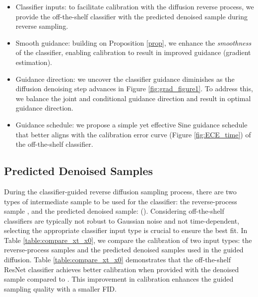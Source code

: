 \documentclass{article}
\theoremstyle{definition}
\begin{document}
\begin{itemize}
\item Classifier inputs: to facilitate calibration with the diffusion reverse process, we provide the off-the-shelf classifier with the predicted denoised sample  during reverse sampling. 
\item Smooth guidance: building on Proposition \ref{prop}, we enhance the \textit{smoothness} of the classifier, enabling calibration to result in improved guidance (gradient estimation). 
\item Guidance direction: we uncover the classifier guidance diminishes as the diffusion denoising step advances in Figure \ref{fig:grad_figure1}. To address this, we balance the joint and conditional guidance direction and result in optimal guidance direction. 
\item Guidance schedule: we propose a simple yet effective Sine guidance schedule that better aligns with the calibration error curve (Figure \ref{fig:ECE_time}) of the off-the-shelf classifier.
\end{itemize}

\subsection{Predicted Denoised Samples}
During the classifier-guided reverse diffusion sampling process, there are two types of intermediate sample to be used for the classifier: the reverse-process sample , and the predicted denoised sample:  (\cite{song2020denoising, bansal2023universal}). 
Considering off-the-shelf classifiers are typically not robust to Gaussian noise and not time-dependent, 
selecting the appropriate classifier input type is crucial to ensure the best fit. In Table \ref{table:compare_xt_x0}, we compare the calibration of two input types: the reverse-process samples  and the predicted denoised samples  used in the guided diffusion. 
Table \ref{table:compare_xt_x0} demonstrates that the off-the-shelf ResNet classifier achieves better calibration when provided with the denoised sample  compared to . This improvement in calibration enhances the guided sampling quality with a smaller FID. 
\end{document}
